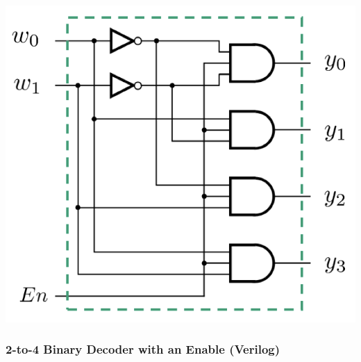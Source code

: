 \documentclass[12pt,openany]{book}
\begin{document}
\begin{minipage}[htp]{0.45\textwidth}
    \begin{center}
        \includegraphics[width=\textwidth]{circuits/16.1_4.png}
    \end{center}
\end{minipage}

\subsubsection{2-to-4 Binary Decoder with an Enable (Verilog)}
\end{document}
